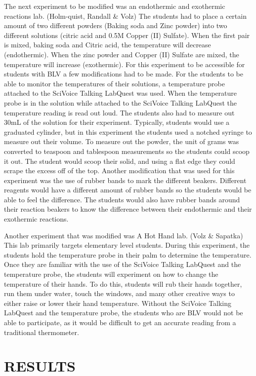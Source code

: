\documentclass[11.5pt]{sig-alternate} %
\begin{document}
\begin{large}
The next experiment to be modified was an endothermic and exothermic reactions lab. (Holm-quist, Randall \& Volz) The students had to place a certain amount of two different powders (Baking soda and Zinc powder) into two different solutions (citric acid and 0.5M Copper (II) Sulfate). When the first pair is mixed, baking soda and Citric acid, the temperature will decrease (endothermic). When the zinc powder and Copper (II) Sulfate are mixed, the temperature will increase (exothermic). For this experiment to be accessible for students with BLV a few modifications had to be made. For the students to be able to monitor the temperatures of their solutions, a temperature probe attached to the SciVoice Talking LabQuest was used. When the temperature probe is in the solution while attached to the SciVoice Talking LabQuest the temperature reading is read out loud. The students also had  to measure out 30mL of the solution for their experiment. Typically, students would use a graduated cylinder, but in this experiment the students used a notched syringe to measure out their volume. To measure out the powder, the unit of grams was converted to teaspoon and tablespoon measurements so the students could scoop it out. The student would scoop their solid, and using a flat edge they could scrape the excess off of the top. Another modification that was used for this experiment was the use of rubber bands to mark the different beakers. Different reagents would have a different amount of rubber bands so the students would be able to feel the difference. The students would also have rubber bands around their reaction beakers to know the difference between their endothermic and their exothermic reactions. 

Another experiment that was modified was A Hot Hand lab. (Volz \& Sapatka) This lab primarily targets elementary level students. During this experiment, the students hold the temperature probe in their palm to determine the temperature. Once they are familiar with the use of the SciVoice Talking LabQuest and the temperature probe, the students will experiment on how to change the temperature of their hands. To do this, students will rub their hands together, run them under water, touch the windows, and many other creative ways to either raise or lower their hand temperature. Without the SciVoice Talking LabQuest and the temperature probe, the students who are BLV would not be able to participate, as it would be difficult to get an accurate reading from a traditional thermometer. 

\section*{RESULTS}


\end{large}
\end{document}
